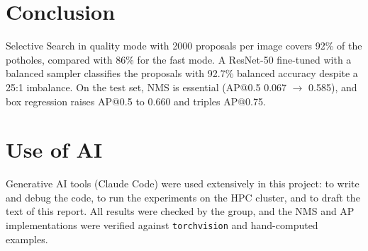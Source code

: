 \documentclass[10pt,twocolumn,letterpaper]{article}
\begin{document}
\section{Conclusion}
Selective Search in quality mode with 2000 proposals per image covers 92\% of the potholes, compared with 86\% for the fast mode. A ResNet-50 fine-tuned with a balanced sampler classifies the proposals with 92.7\% balanced accuracy despite a 25:1 imbalance. On the test set, NMS is essential (AP@0.5 0.067 $\to$ 0.585), and box regression raises AP@0.5 to 0.660 and triples AP@0.75.

\section{Use of AI}
Generative AI tools (Claude Code) were used extensively in this project: to write and debug the code, to run the experiments on the HPC cluster, and to draft the text of this report. All results were checked by the group, and the NMS and AP implementations were verified against \texttt{torchvision} and hand-computed examples.
\end{document}

